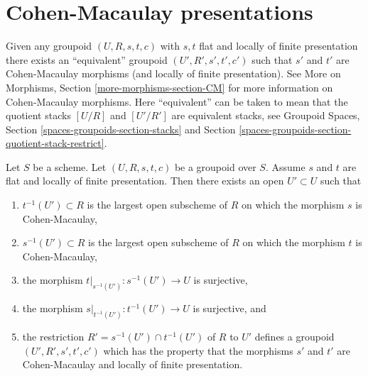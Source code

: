 \section{Cohen-Macaulay presentations}
\label{section-CM}

\noindent
Given any groupoid $(U, R, s, t, c)$ with $s, t$ flat and
locally of finite presentation there exists an ``equivalent''
groupoid $(U', R', s', t', c')$ such that $s'$ and $t'$ are
Cohen-Macaulay morphisms (and locally of finite presentation). See
More on Morphisms, Section \ref{more-morphisms-section-CM}
for more information on Cohen-Macaulay morphisms.
Here ``equivalent'' can be taken to mean that the quotient stacks
$[U/R]$ and $[U'/R']$ are equivalent stacks, see
Groupoid Spaces, Section \ref{spaces-groupoids-section-stacks}
and Section \ref{spaces-groupoids-section-quotient-stack-restrict}.

\begin{lemma}
\label{lemma-make-CM}
Let $S$ be a scheme.
Let $(U, R, s, t, c)$ be a groupoid over $S$.
Assume $s$ and $t$ are flat and locally of finite presentation.
Then there exists an open $U' \subset U$ such that
\begin{enumerate}
\item $t^{-1}(U') \subset R$ is the largest open subscheme of
$R$ on which the morphism $s$ is Cohen-Macaulay,
\item $s^{-1}(U') \subset R$ is the largest open subscheme of
$R$ on which the morphism $t$ is Cohen-Macaulay,
\item the morphism $t|_{s^{-1}(U')} : s^{-1}(U') \to U$ is
surjective,
\item the morphism $s|_{t^{-1}(U')} : t^{-1}(U') \to U$ is
surjective, and
\item the restriction $R' = s^{-1}(U') \cap t^{-1}(U')$
of $R$ to $U'$ defines a groupoid $(U', R', s', t', c')$ which has the property
that the morphisms $s'$ and $t'$ are Cohen-Macaulay and locally of
finite presentation.
\end{enumerate}
\end{lemma}

